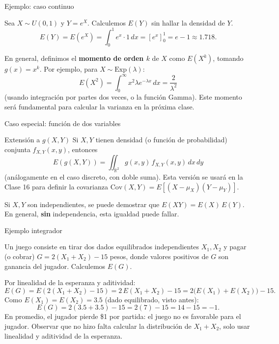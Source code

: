 \documentclass[aspectratio=169,11pt]{beamer}
\begin{document}
\begin{frame}{Ejemplo: caso continuo}
\begin{example}
Sea $X \sim U(0,1)$ y $Y = e^X$. Calculemos $E(Y)$ sin hallar la densidad de $Y$.
\[
E(Y) = E(e^X) = \int_0^1 e^x \cdot 1\, dx = \left[e^x\right]_0^1 = e - 1 \approx 1.718.
\]
\end{example}

\begin{example}
En general, definimos el \textbf{momento de orden $k$} de $X$ como $E(X^k)$, tomando $g(x) = x^k$. Por ejemplo, para $X \sim \text{Exp}(\lambda)$:
\[
E(X^2) = \int_0^\infty x^2 \lambda e^{-\lambda x}\, dx = \frac{2}{\lambda^2}
\]
(usando integración por partes dos veces, o la función Gamma). Este momento será fundamental para calcular la varianza en la próxima clase.
\end{example}
\end{frame}

\begin{frame}{Caso especial: función de dos variables}
\begin{block}{Extensión a $g(X,Y)$}
Si $X,Y$ tienen densidad (o función de probabilidad) conjunta $f_{X,Y}(x,y)$, entonces
\[
E(g(X,Y)) = \iint_{\mathbb{R}^2} g(x,y)\, f_{X,Y}(x,y)\, dx\, dy
\]
(análogamente en el caso discreto, con doble suma). Esta versión se usará en la Clase 16 para definir la covarianza $\text{Cov}(X,Y) = E[(X-\mu_X)(Y-\mu_Y)]$.
\end{block}

\begin{example}
Si $X, Y$ son independientes, se puede demostrar que $E(XY) = E(X)\,E(Y)$. En general, \textbf{sin} independencia, esta igualdad puede fallar.
\end{example}
\end{frame}

\begin{frame}{Ejemplo integrador}
\begin{example}
Un juego consiste en tirar dos dados equilibrados independientes $X_1, X_2$ y pagar (o cobrar) $G = 2(X_1+X_2) - 15$ pesos, donde valores positivos de $G$ son ganancia del jugador. Calculemos $E(G)$.

\medskip
Por linealidad de la esperanza y aditividad:
\[
E(G) = E(2(X_1+X_2)-15) = 2\,E(X_1+X_2) - 15 = 2\big(E(X_1)+E(X_2)\big) - 15.
\]
Como $E(X_1)=E(X_2)=3.5$ (dado equilibrado, visto antes):
\[
E(G) = 2(3.5+3.5) - 15 = 2(7) - 15 = 14-15 = -1.
\]
En promedio, el jugador pierde \$1 por partida: el juego no es favorable para el jugador. Observar que no hizo falta calcular la distribución de $X_1+X_2$, solo usar linealidad y aditividad de la esperanza.
\end{example}
\end{frame}
\end{document}
